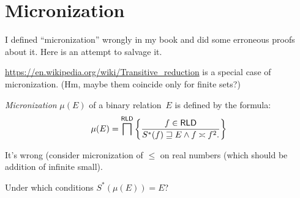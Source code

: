 \chapter{Micronization}

I defined ``micronization'' wrongly in my book and did some erroneous
proofs about it. Here is an attempt to salvage it.

\url{https://en.wikipedia.org/wiki/Transitive_reduction} is a special
case of micronization. (Hm, maybe them coincide only for finite sets?)

\begin{defn}
\emph{Micronization} $\mu(E)$ of a binary relation~$E$ is defined by
the formula:
\[
  \mu(E) = \bigsqcap^{\mathsf{RLD}} \left\{ \frac{f\in\mathsf{RLD}}{
    S^{\ast}(f)\sqsupseteq E \land f\asymp f^2.
  }\right\}
\]
\end{defn}

It's wrong (consider micronization of $\leq$ on real numbers
(which should be addition of infinite small).

\begin{question}
Under which conditions $S^\ast(\mu(E)) = E$?
\end{question}
